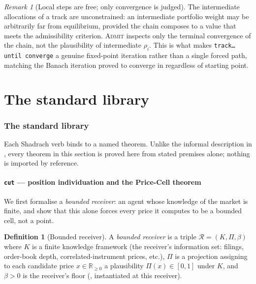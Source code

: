 \documentclass[11pt,a4paper]{article}
\theoremstyle{thmstyle}
\theoremstyle{definition}
\newtheorem{definition}[theorem]{Definition}
\theoremstyle{remark}
\newtheorem{remark}[theorem]{Remark}
\newcommand{\R}{\mathbb{R}}
\newcommand{\flo}{\beta}
\newcommand{\res}{\rho}
\newcommand{\sh}[1]{\texttt{#1}}
\newcommand{\Rec}{\mathcal{R}}
\begin{document}
\begin{remark}[Local steps are free; only convergence is judged]
\label{rem:local-free}
The intermediate allocations of a track are unconstrained: an
intermediate portfolio weight may be arbitrarily far from equilibrium,
provided the chain composes to a value that meets the admissibility
criterion. \textsc{Admit} inspects only the terminal convergence of the
chain, not the plausibility of intermediate $\res_i$. This is what makes
\sh{track\ldots until\ converge} a genuine fixed-point iteration rather
than a single forced path, matching the Banach iteration proved to
converge in  regardless of starting point.
\end{remark}

\part{The standard library}

\section{The standard library}
\label{sec:stdlib}

Each Shadrach verb binds to a named theorem. Unlike the informal
description in , every theorem in this section is
proved here from stated premises alone; nothing is imported by
reference.

\subsection{\texorpdfstring{\sh{cut} --- position individuation and the Price-Cell theorem}{cut --- position individuation}}
\label{sec:stdlib-position}

We first formalise a \emph{bounded receiver}: an agent whose knowledge
of the market is finite, and show that this alone forces every price it
computes to be a bounded cell, not a point.

\begin{definition}[Bounded receiver]
\label{def:receiver}
A \emph{bounded receiver} is a triple $\Rec=(K,\Pi,\flo)$ where $K$ is a
finite knowledge framework (the receiver's information set: filings,
order-book depth, correlated-instrument prices, etc.), $\Pi$ is a
projection assigning to each candidate price $x\in\R_{\ge0}$ a
plausibility $\Pi(x)\in[0,1]$ under $K$, and $\flo>0$ is the receiver's
floor (, instantiated at this receiver).
\end{definition}
\end{document}
